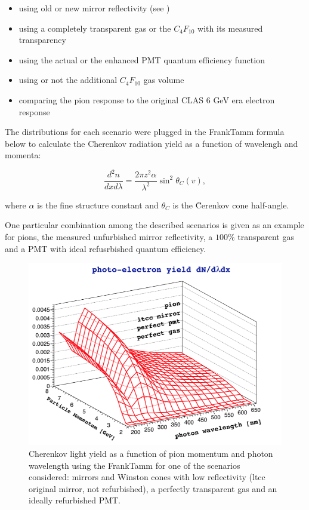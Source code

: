 \begin{itemize}
	\item using old or new mirror reflectivity (see )
	\item using a completely transparent gas or the $C_4F_{10}$ with its measured transparency
	\item using the actual or the enhanced PMT quantum efficiency function
	\item using or not the additional $C_4F_{10}$ gas volume
	\item comparing the pion response to the original CLAS 6 GeV era electron response
\end{itemize}

The distributions for each scenario were plugged in the Frank\textendash Tamm formula \cite{Frank:1937fk} below to calculate
the Cherenkov radiation yield as a function of wavelengh and momenta:


\begin{equation} \label{eq:cerenkov}
	\frac{d^2n}{dxd\lambda} = \frac{2\pi z^2\alpha}{\lambda^2}\sin^2{\theta_C(v)},
\end{equation}

where $\alpha$ is the fine structure constant and $\theta_C$ is the \u{C}erenkov cone half-angle.

One particular combination among the described scenarios is given as an example  for pions,
the measured unfurbished mirror reflectivity, a $100\%$ transparent gas and a PMT with ideal refusrbished quantum efficiency.

\begin{figure}
	\centering
	\includegraphics[width=0.95\columnwidth,keepaspectratio]{img/photonYieldStudy.png}
	\caption{Cherenkov light yield as a function of pion momentum and photon wavelength using the Frank\textendash Tamm for one of the scenarios considered:
            mirrors and Winston cones with low reflectivity (ltcc original mirror, not refurbished), a perfectly transparent gas and an ideally refurbished PMT.}
	\label{fig:photonYieldStudy}
\end{figure}


